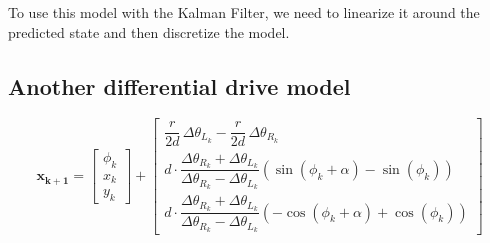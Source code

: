 \documentclass[12pt]{article}
\begin{document}
 To use this model with the Kalman Filter, we need to linearize it around 
 the predicted state and then discretize the model.

 \subsection{Another differential drive model}
 \renewcommand{\arraystretch}{1.5}
 \begin{equation}
     \mathbf{x_{k+1}} = \begin{bmatrix}
         \phi_k \\ x_k \\ y_k
     \end{bmatrix} + 
     \begin{bmatrix}
         \dfrac{r}{2d}\,\Delta\theta_{L_k} - \dfrac{r}{2d} \,\Delta\theta_{R_k} \\
         d\cdot \dfrac{\Delta\theta_{R_k} + \Delta\theta_{L_k}}{\Delta\theta_{R_k} - \Delta\theta_{L_k}}\left( \sin(\phi_k + \alpha) - \sin(\phi_k) \right) \\
         d\cdot\dfrac{\Delta\theta_{R_k} + \Delta\theta_{L_k}}{\Delta\theta_{R_k} - \Delta\theta_{L_k}}\left( -\cos(\phi_k + \alpha) + \cos(\phi_k) \right) 
     \end{bmatrix}
 \end{equation}
 \renewcommand{\arraystretch}{1}
\end{document}
